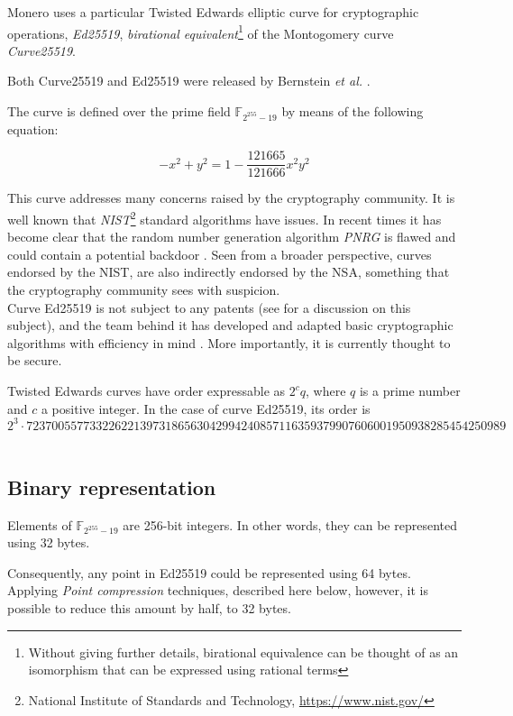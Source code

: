 Monero uses a particular Twisted Edwards elliptic curve for cryptographic operations, {\em Ed25519}, {\em birational equivalent}\footnote{Without giving further details, birational equivalence can be thought of as an isomorphism that can be expressed using rational terms} 
of the Montogomery curve {\em Curve25519}.

Both Curve25519 and Ed25519 were released by Bernstein {\em et al.} \cite{Bernstein2008, Bernstein2012, cryptoeprint:2007:286}.

The curve is defined over the prime field \(\mathbb{F}_{2^{255} - 19} \) by means of the following equation:

\[ -x^2 + y^2 = 1 - \frac{121665}{121666} x^2 y^2 \]

This curve addresses many concerns raised by the cryptography community. It is well known that {\em NIST}\footnote{National Institute of Standards and Technology, \url{https://www.nist.gov/}} 
standard algorithms have issues. In recent times it has become clear that the random number generation algorithm {\em PNRG} is flawed and could contain a potential backdoor \cite{hales2014nsa}. Seen from a broader perspective, curves endorsed by the NIST, are also indirectly endorsed by the NSA, something that the cryptography community sees with suspicion.
\\

Curve Ed25519 is not subject to any patents (see \cite{ECC-patents} for a discussion on this subject), and the team behind it has
developed and adapted basic cryptographic algorithms with efficiency in mind \cite{cryptoeprint:2007:286}.
More importantly, it is currently thought to be secure.

Twisted Edwards curves have order expressable as \(2^c q\), where \(q\) is a prime number and \(c\) a positive integer. In the case of curve Ed25519, its order is \[2^3 \cdot 7237005577332262213973186563042994240857116359379907606001950938285454250989\]
\\
\subsection{Binary representation}
Elements of \(\mathbb{F}_{2^{255} - 19} \) are 256-bit integers. In other words, they can be
represented using 32 bytes.

Consequently, any point in Ed25519 could be represented using 64 bytes.
Applying {\em Point compression} techniques, described here below, however, it is possible to reduce this amount by half, to 32 bytes.


